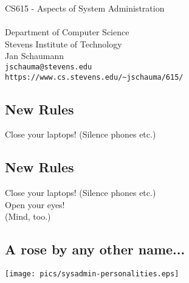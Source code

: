 \documentclass[xga]{xdvislides}
\begin{document}
\setfontphv

\lhead{\slidetitle}				%
\cfoot{\relax}					%
\rfoot{\Gray{\today}}

\vspace*{\fill}
\begin{center}
	\Hugesize
		CS615 - Aspects of System Administration\\ [1em]
	\hspace*{5mm}\blueline\\ [1em]
	\Normalsize
		Department of Computer Science\\
		Stevens Institute of Technology\\
		Jan Schaumann\\
		\verb+jschauma@stevens.edu+ \\
		\verb+https://www.cs.stevens.edu/~jschauma/615/+
\end{center}
\vspace*{\fill}

\subsection{New Rules}
\Hugesize
\vspace*{\fill}
\begin{center}
Close your laptops! (Silence phones etc.)
\end{center}
\vspace*{\fill}
\Normalsize

\subsection{New Rules}
\Hugesize
\vspace*{\fill}
\begin{center}
Close your laptops! (Silence phones etc.) \\
\vspace{.5in}
Open your eyes! \\
\small
(Mind, too.)
\end{center}
\vspace*{\fill}
\Normalsize

\subsection{A rose by any other name...}
\vspace*{\fill}
\begin{center}
	\texttt{[image: pics/sysadmin-personalities.eps]} \\
\end{center}
\vspace*{\fill}
\end{document}
